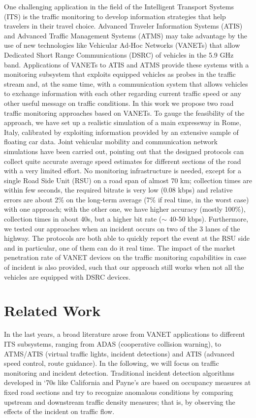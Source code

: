 \documentclass[conference]{IEEEtran}
\begin{document}
One challenging application in the field of the Intelligent Transport Systems (ITS) is the traffic monitoring to develop information strategies that help travelers in their travel choice. Advanced Traveler Information Systems (ATIS) and Advanced
Traffic Management Systems (ATMS) may take advantage by the use of new technologies like Vehicular Ad-Hoc Networks (VANETs) that allow Dedicated Short Range Communications (DSRC) of vehicles in the 5.9 GHz band. Applications of VANETs
to ATIS and ATMS provide these systems with a monitoring
subsystem that exploits equipped vehicles as probes in the
traffic stream and, at the same time, with a communication
system that allows vehicles to exchange information with each
other regarding current traffic speed or any other useful message on traffic conditions. In this work we propose two road traffic monitoring approaches based on VANETs. To gauge the feasibility of the approach, we have set up a realistic
simulation of a main expressway in Rome, Italy, calibrated by exploiting information
provided by an extensive sample of floating car data. Joint vehicular mobility and communication
network simulations have been carried out, pointing out that the designed protocols
can collect quite accurate average speed estimates for different sections of the road with a
very limited effort. No monitoring infrastructure is needed, except for a single Road Side Unit (RSU) on a road span of almost
70 km; collection times are within few seconds, the required bitrate is very low (0.08 kbps) and relative errors are about 2\% on the long-term average (7\% if real time, in the worst case)
 with one approach; with the other one, we have higher accuracy (mostly 100\%), collection times in about 40s, but a higher bit rate ($\sim$ 40-50 kbps). Furthermore, we tested our approaches when an incident occurs on two of the 3 lanes of the highway. The protocols are both able to quickly report the event at the RSU side and in particular, one of them can do it real time. The impact of the market penetration rate of VANET devices on the traffic monitoring capabilities in case of incident is also provided, such that our approach still works when not all the vehicles are equipped with DSRC devices.




\section{Related Work}
\label{related}


In the last years, a broad literature arose from VANET applications to different ITS subsystems, ranging from ADAS (cooperative collision warning), to ATMS/ATIS (virtual traffic lights, incident detections) and ATIS (advanced speed control, route guidance). In the following, we will focus on traffic monitoring and incident detection.
Traditional incident detection algorithms developed in ‘70s like California and Payne's \cite{payne1978freeway} are based on occupancy measures at fixed road sections and try to recognize anomalous conditions by comparing upstream and downstream traffic density measures; that is, by observing the effects of the incident on traffic flow.
\end{document}
